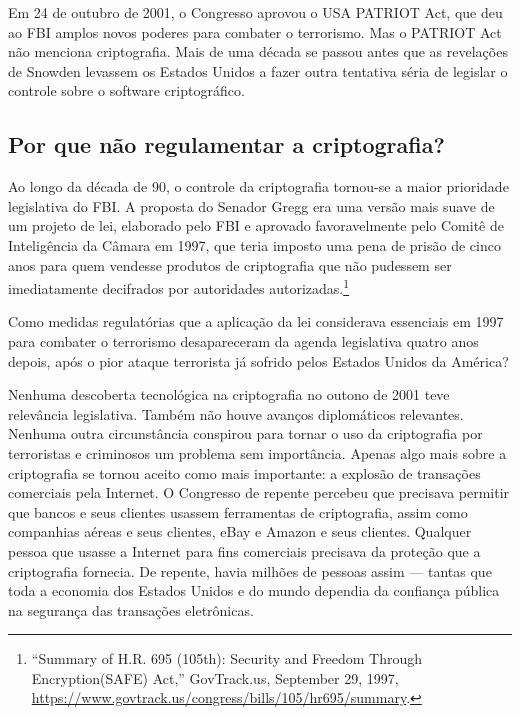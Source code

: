 \documentclass{book}
\begin{document}
Em 24 de outubro de 2001, o Congresso aprovou o USA PATRIOT Act, que deu ao FBI amplos novos poderes para combater o terrorismo. Mas o PATRIOT Act não menciona criptografia. Mais de uma década se passou antes que as revelações de Snowden levassem os Estados Unidos a fazer outra tentativa séria de legislar o controle sobre o software criptográfico.


\subsection{Por que não regulamentar a criptografia?}
\label{segredos:regulamentar}

Ao longo da década de 90, o controle da criptografia tornou-se a maior prioridade legislativa do FBI. A proposta do Senador Gregg era uma versão mais suave de um projeto de lei, elaborado pelo FBI e aprovado favoravelmente pelo Comitê de Inteligência da Câmara em 1997, que teria imposto uma pena de prisão de cinco anos para quem vendesse produtos de criptografia que não pudessem ser imediatamente decifrados por autoridades autorizadas.\footnote{“Summary of H.R. 695 (105th): Security and Freedom Through Encryption(SAFE) Act,” GovTrack.us, September 29, 1997, \url{https://www.govtrack.us/congress/bills/105/hr695/summary}.}

Como medidas regulatórias que a aplicação da lei considerava essenciais em 1997 para combater o terrorismo desapareceram da agenda legislativa quatro anos depois, após o pior ataque terrorista já sofrido pelos Estados Unidos da América?

Nenhuma descoberta tecnológica na criptografia no outono de 2001 teve relevância legislativa. Também não houve avanços diplomáticos relevantes. Nenhuma outra circunstância conspirou para tornar o uso da criptografia por terroristas e criminosos um problema sem importância. Apenas algo mais sobre a criptografia se tornou aceito como mais importante: a explosão de transações comerciais pela Internet. O Congresso de repente percebeu que precisava permitir que bancos e seus clientes usassem ferramentas de criptografia, assim como companhias aéreas e seus clientes, eBay e Amazon e seus clientes. Qualquer pessoa que usasse a Internet para fins comerciais precisava da proteção que a criptografia fornecia. De repente, havia milhões de pessoas assim --- tantas que toda a economia dos Estados Unidos e do mundo dependia da confiança pública na segurança das transações eletrônicas.
\end{document}
